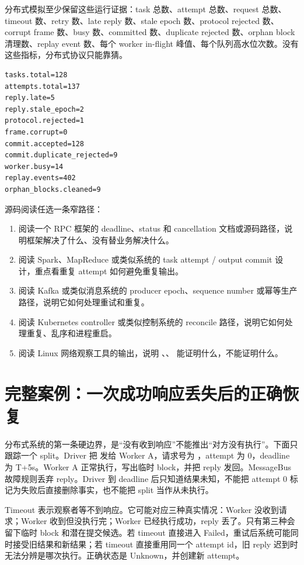 分布式模拟至少保留这些运行证据：task 总数、attempt 总数、request 总数、timeout 数、retry 数、late reply 数、stale epoch 数、protocol rejected 数、corrupt frame 数、busy 数、committed 数、duplicate rejected 数、orphan block 清理数、replay event 数、每个 worker in-flight 峰值、每个队列高水位次数。没有这些指标，分布式协议只能靠猜。

\begin{lstlisting}[numbers=none,caption={分布式模拟运行证据示例}]
tasks.total=128
attempts.total=137
reply.late=5
reply.stale_epoch=2
protocol.rejected=1
frame.corrupt=0
commit.accepted=128
commit.duplicate_rejected=9
worker.busy=14
replay.events=402
orphan_blocks.cleaned=9
\end{lstlisting}

\begin{sourcereadingbox}
源码阅读任选一条窄路径：
\begin{enumerate}
  \item 阅读一个 RPC 框架的 deadline、status 和 cancellation 文档或源码路径，说明框架解决了什么、没有替业务解决什么。
  \item 阅读 Spark、MapReduce 或类似系统的 task attempt / output commit 设计，重点看重复 attempt 如何避免重复输出。
  \item 阅读 Kafka 或类似消息系统的 producer epoch、sequence number 或幂等生产路径，说明它如何处理重试和重复。
  \item 阅读 Kubernetes controller 或类似控制系统的 reconcile 路径，说明它如何处理重复、乱序和进程重启。
  \item 阅读 Linux 网络观察工具的输出，说明 、、 能证明什么，不能证明什么。
\end{enumerate}
\end{sourcereadingbox}

\section{完整案例：一次成功响应丢失后的正确恢复}

分布式系统的第一条硬边界，是“没有收到响应”不能推出“对方没有执行”。下面只跟踪一个 split。Driver 把  发给 Worker A，请求号为 ，attempt 为 0，deadline 为 T+5s。Worker A 正常执行，写出临时 block，并把 reply 发回。MessageBus 故障规则丢弃 reply。Driver 到 deadline 后只知道结果未知，不能把 attempt 0 标记为失败后直接删除事实，也不能把 split 当作从未执行。

Timeout 表示观察者等不到响应。它可能对应三种真实情况：Worker 没收到请求；Worker 收到但没执行完；Worker 已经执行成功，reply 丢了。只有第三种会留下临时 block 和潜在提交候选。若 timeout 直接进入 Failed，重试后系统可能同时接受旧结果和新结果；若 timeout 直接重用同一个 attempt id，旧 reply 迟到时无法分辨是哪次执行。正确状态是 Unknown，并创建新 attempt。

